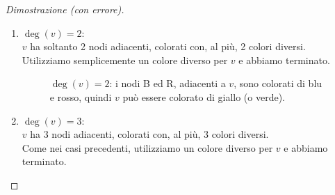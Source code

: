 \documentclass[a4paper,12pt,titlepage]{report}
\begin{document}
\begin{proof}[Dimostrazione (con errore)]
\begin{enumerate}
\begin{figure}[H]
        		\vspace{0.5cm}
        		\caption{$\deg(v) = 1$: il nodo B, adiacente a $v$, è colorato di blu, quindi $v$ può essere colorato di rosso (oppure verde o giallo).}
        	\end{figure}
        	\item $\deg(v) = 2$:
        	\\$v$ ha soltanto 2 nodi adiacenti, colorati con, al più, 2 colori diversi. \\Utilizziamo semplicemente un colore diverso per $v$ e abbiamo terminato.
        	\begin{figure}[H]
        		\centering
        		\vspace{0.5cm}
        		\caption{$\deg(v) = 2$: i nodi B ed R, adiacenti a $v$, sono colorati di blu e rosso, quindi $v$ può essere colorato di giallo (o verde).}
        	\end{figure}
        	\item $\deg(v) = 3$:
        	\\$v$ ha 3 nodi adiacenti, colorati con, al più, 3 colori diversi. 
        	\\Come nei casi precedenti, utilizziamo un colore diverso per $v$ e abbiamo terminato.
        	\begin{figure}[H]
        		\centering
\end{figure}
\end{enumerate}
\end{proof}
\end{document}
